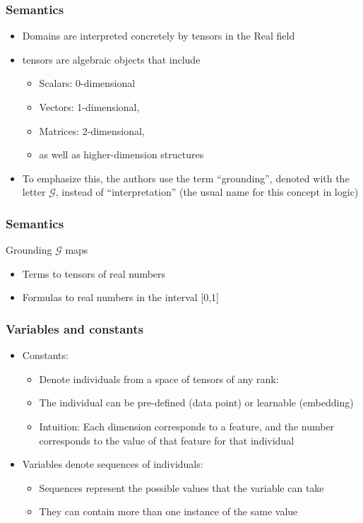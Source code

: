 \documentclass{beamer}
\newcommand{\G}{\mathcal{G}}
\begin{document}
\begin{frame}
  \frametitle{Semantics}
  \begin{itemize}
  \item Domains are interpreted concretely by tensors in the Real
    field
  \item tensors are algebraic objects that include
    \begin{itemize}
    \item Scalars: 0-dimensional
    \item Vectors: 1-dimensional,
    \item Matrices: 2-dimensional,
    \item as well as higher-dimension structures
    \end{itemize}
  \item To emphasize this, the authors use the term ``grounding'',
    denoted with the letter $\G$, instead of
    ``interpretation'' (the usual name for this concept in logic)
  \end{itemize}
\end{frame}

\begin{frame}
  \frametitle{Semantics}
  Grounding $\mathcal{G}$ maps
  \begin{itemize}
  \item Terms to tensors of real numbers
  \item Formulas to real numbers in the interval [0,1]
  \end{itemize}
\end{frame}

\begin{frame}
  \frametitle{Variables and constants}
  \begin{itemize}
  \item Constants:
    \begin{itemize}
    \item Denote individuals from a space of tensors of any rank:
    \item The individual can be pre-defined (data point) or learnable
      (embedding)
    \item Intuition: Each dimension corresponds to a feature, and the
      number corresponds to the value of that feature for that
      individual
    \end{itemize}
  \item Variables denote sequences of individuals:
    \begin{itemize}
    \item Sequences represent the possible values that the variable can take
    \item They can contain more than one instance of the same value
    \end{itemize}
  \end{itemize}
\end{frame}
\end{document}
